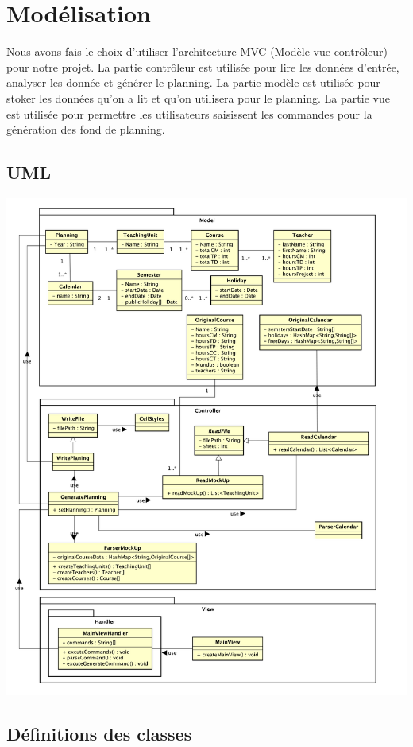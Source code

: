 \documentclass{polytech/polytech}
\begin{document}
	\section{Modélisation}

	Nous avons fais le choix d'utiliser l'architecture MVC (Modèle-vue-contrôleur) pour notre projet.
	La partie contrôleur est utilisée pour lire les données d'entrée, analyser les donnée et générer le planning.
	La partie modèle est utilisée pour stoker les données qu'on a lit et qu'on utilisera pour le planning.
	La partie vue est utilisée pour permettre les utilisateurs saisissent les commandes pour la génération des fond de planning.

	\subsection{UML}
	\includegraphics[width=\textwidth]{./img/Diagram.png}

	\subsection{Définitions des classes}
\end{document}
